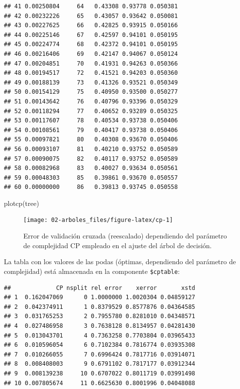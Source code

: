 \documentclass[
  spanish,
]{book}
\newenvironment{Shaded}{\begin{snugshade}}{\end{snugshade}}
\newcommand{\DecValTok}[1]{\textcolor[rgb]{0.00,0.00,0.81}{#1}}
\newcommand{\FunctionTok}[1]{\textcolor[rgb]{0.00,0.00,0.00}{#1}}
\newcommand{\NormalTok}[1]{#1}
\newcommand{\SpecialCharTok}[1]{\textcolor[rgb]{0.00,0.00,0.00}{#1}}
\theoremstyle{break}
\theoremstyle{definition}
\theoremstyle{definition}
\theoremstyle{definition}
\theoremstyle{definition}
\theoremstyle{remark}
\begin{document}
\begin{verbatim}
## 41 0.00250804     64   0.43308 0.93778 0.050381
## 42 0.00232226     65   0.43057 0.93642 0.050081
## 43 0.00227625     66   0.42825 0.93915 0.050166
## 44 0.00225146     67   0.42597 0.94101 0.050195
## 45 0.00224774     68   0.42372 0.94101 0.050195
## 46 0.00216406     69   0.42147 0.94067 0.050124
## 47 0.00204851     70   0.41931 0.94263 0.050366
## 48 0.00194517     72   0.41521 0.94203 0.050360
## 49 0.00188139     73   0.41326 0.93521 0.050349
## 50 0.00154129     75   0.40950 0.93500 0.050277
## 51 0.00143642     76   0.40796 0.93396 0.050329
## 52 0.00118294     77   0.40652 0.93289 0.050325
## 53 0.00117607     78   0.40534 0.93738 0.050406
## 54 0.00108561     79   0.40417 0.93738 0.050406
## 55 0.00097821     80   0.40308 0.93670 0.050406
## 56 0.00093107     81   0.40210 0.93752 0.050589
## 57 0.00090075     82   0.40117 0.93752 0.050589
## 58 0.00082968     83   0.40027 0.93634 0.050561
## 59 0.00048303     85   0.39861 0.93670 0.050557
## 60 0.00000000     86   0.39813 0.93745 0.050558
\end{verbatim}

\begin{Shaded}
\begin{Highlighting}[]
\FunctionTok{plotcp}\NormalTok{(tree)}
\end{Highlighting}
\end{Shaded}

\begin{figure}[!htb]

{\centering \texttt{[image: 02-arboles\_files/figure-latex/cp-1]} 

}

\caption{Error de validación cruzada (reescalado) dependiendo del parámetro de complejidad CP empleado en el ajuste del árbol de decisión.}\label{fig:cp}
\end{figure}

La tabla con los valores de las podas (óptimas, dependiendo del parámetro de complejidad)
está almacenada en la componente \texttt{\$cptable}:

\begin{Shaded}
\end{Shaded}

\begin{verbatim}
##             CP nsplit rel error    xerror       xstd
## 1  0.162047069      0 1.0000000 1.0020304 0.04859127
## 2  0.042374911      1 0.8379529 0.8577876 0.04364585
## 3  0.031765253      2 0.7955780 0.8281010 0.04348571
## 4  0.027486958      3 0.7638128 0.8134957 0.04281430
## 5  0.013043701      4 0.7363258 0.7703804 0.03965433
## 6  0.010596054      6 0.7102384 0.7816774 0.03935308
## 7  0.010266055      7 0.6996424 0.7817716 0.03914071
## 8  0.008408003      9 0.6791102 0.7817177 0.03912344
## 9  0.008139238     10 0.6707022 0.8011719 0.03991498
## 10 0.007805674     11 0.6625630 0.8001996 0.04048088
\end{verbatim}
\end{document}
